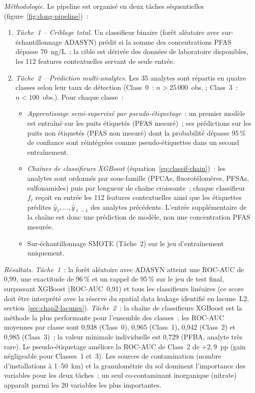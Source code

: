 \emph{M\'ethodologie.}
Le pipeline est organis\'e en deux t\^aches s\'equentielles (figure~\ref{fig:dong-pipeline})~:
\begin{enumerate}
    \item \emph{T\^ache~1 -- Criblage total.}
    Un classifieur binaire (for\^et al\'eatoire avec sur-\'echantillonnage ADASYN) pr\'edit si la somme des concentrations PFAS d\'epasse 70~ng/L~; la cible est d\'eriv\'ee des donn\'ees de laboratoire disponibles, les 112 features contextuelles servant de seule entr\'ee.
    \item \emph{T\^ache~2 -- Pr\'ediction multi-analytes.}
    Les 35 analytes sont r\'epartis en quatre classes selon leur taux de d\'etection (Class~0~: $n > 25\,000$~obs. ; Class~3~: $n < 100$~obs.).
    Pour chaque classe~:
    \begin{itemize}
        \item \emph{Apprentissage semi-supervis\'e par pseudo-\'etiquetage}~: un premier mod\`ele est entra\^in\'e sur les puits \'etiquet\'es (PFAS mesur\'e)~; ses pr\'edictions sur les puits non \'etiquet\'es (PFAS non mesur\'e) dont la probabilit\'e d\'epasse 95\,\% de confiance sont r\'eint\'egr\'ees comme pseudo-\'etiquettes dans un second entra\^inement.
        \item \emph{Cha\^ines de classifieurs XGBoost} (\'equation~\eqref{eq:classif-chain})~: les analytes sont ordonn\'es par sous-famille (PFCAs, fluorot\'elom\`eres, PFSAs, sulfonamides) puis par longueur de cha\^ine croissante~; chaque classifieur $f_\ell$ re\c{c}oit en entr\'ee les 112 features contextuelles ainsi que les \'etiquettes pr\'edites $\hat{y}_1, \ldots, \hat{y}_{\ell-1}$ des analytes pr\'ec\'edents.
        L'entr\'ee suppl\'ementaire de la cha\^ine est donc une pr\'ediction de mod\`ele, non une concentration PFAS mesur\'ee.
        \item Sur-\'echantillonnage SMOTE (T\^ache~2) sur le jeu d'entra\^inement uniquement.
    \end{itemize}
\end{enumerate}

\emph{R\'esultats.}
\emph{T\^ache~1}~: la for\^et al\'eatoire avec ADASYN atteint une ROC-AUC de 0,99, une exactitude de 96\,\% et un rappel de 95\,\% sur le jeu de test final, surpassant XGBoost (ROC-AUC~0,91) et tous les classifieurs lin\'eaires (ce score doit \^etre interpr\'et\'e avec la r\'eserve du spatial data leakage identifi\'e en lacune~L2, section~\ref{sec:chap2-lacunes}).
\emph{T\^ache~2}~: la cha\^ine de classifieurs XGBoost est la m\'ethode la plus performante pour l'ensemble des classes~; les ROC-AUC moyennes par classe sont 0,938 (Class~0), 0,965 (Class~1), 0,942 (Class~2) et 0,985 (Class~3)~; la valeur minimale individuelle est 0,729 (PFBA, analyte tr\`es rare).
Le pseudo-\'etiquetage am\'eliore la ROC-AUC de Class~2 de $+2{,}9$~pp (gain n\'egligeable pour Classes~1 et~3).
Les sources de contamination (nombre d'installations \`a 1--50~km) et la granulom\'etrie du sol dominent l'importance des variables pour les deux t\^aches~; un seul co-contaminant inorganique (nitrate) appara\^it parmi les 20 variables les plus importantes.

